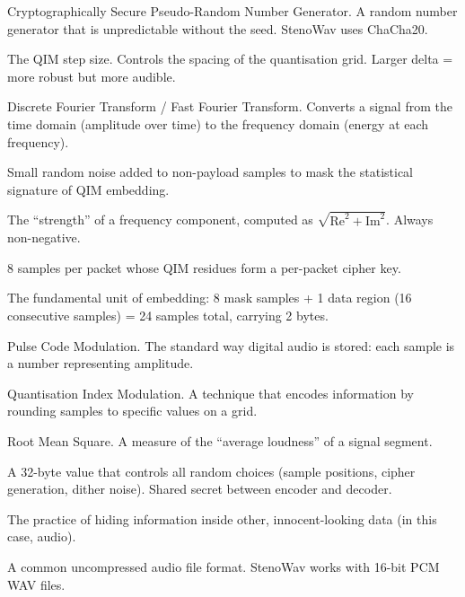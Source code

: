 \documentclass[11pt,a4paper]{article}
\begin{document}
\begin{description}[style=nextline]
    \item[CSPRNG]
        Cryptographically Secure Pseudo-Random Number Generator.
        A random number generator that is unpredictable without the seed.
        StenoWav uses ChaCha20.

    \item[Delta ($\Delta$)]
        The QIM step size.  Controls the spacing of the quantisation grid.
        Larger delta = more robust but more audible.

    \item[DFT / FFT]
        Discrete Fourier Transform / Fast Fourier Transform.  Converts
        a signal from the time domain (amplitude over time) to the
        frequency domain (energy at each frequency).

    \item[Dither]
        Small random noise added to non-payload samples to mask the
        statistical signature of QIM embedding.

    \item[Magnitude]
        The ``strength'' of a frequency component, computed as
        $\sqrt{\text{Re}^2 + \text{Im}^2}$.  Always non-negative.

    \item[Mask samples]
        8 samples per packet whose QIM residues form a per-packet cipher key.

    \item[Packet]
        The fundamental unit of embedding: 8 mask samples + 1 data region
        (16 consecutive samples) = 24 samples total, carrying 2 bytes.

    \item[PCM]
        Pulse Code Modulation.  The standard way digital audio is stored:
        each sample is a number representing amplitude.

    \item[QIM]
        Quantisation Index Modulation.  A technique that encodes information
        by rounding samples to specific values on a grid.

    \item[RMS]
        Root Mean Square.  A measure of the ``average loudness'' of a
        signal segment.

    \item[Seed / Key]
        A 32-byte value that controls all random choices (sample positions,
        cipher generation, dither noise).  Shared secret between encoder
        and decoder.

    \item[Steganography]
        The practice of hiding information inside other, innocent-looking
        data (in this case, audio).

    \item[WAV]
        A common uncompressed audio file format.  StenoWav works with
        16-bit PCM WAV files.
\end{description}
\end{document}
